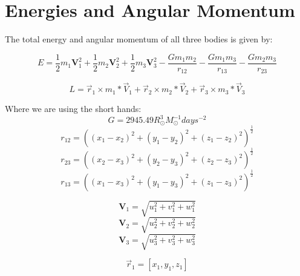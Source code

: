 \documentclass[letterpaper,12pt]{article}
\begin{document}
\section{Energies and Angular Momentum}
The total energy and angular momentum of all three bodies is given by:

\begin{equation} \label{eq:ergo}
    E = \frac{1}{2}m_{1}\textbf{V}_{1}^{2}+\frac{1}{2}m_{2}\textbf{V}_{2}^{2}+\frac{1}{2}m_{3}\textbf{V}_{3}^{2} - \frac{Gm_{1}m_{2}}{r_{12}} - \frac{Gm_{1}m_{3}}{r_{13}} - \frac{Gm_{2}m_{3}}{r_{23}}
\end{equation}

\begin{equation}
    L = \Vec{r}_{1}\times m_{1}*\Vec{V}_{1}+\Vec{r}_{2}\times m_{2}*\Vec{V}_{2}+\Vec{r}_{3}\times m_{3}*\Vec{V}_{3}
\end{equation}

Where we are using the short hands:
\begin{equation}
    G = 2945.49 R_{\odot}^{3}M_{\odot}^{-1}days^{-2}
\end{equation}
\begin{equation}
    r_{12} = ((x_{1} - x_{2})^{2} + (y_{1} - y_{2})^{2} + (z_{1} - z_{2})^{2})^{\frac{1}{2}}
\end{equation}
\begin{equation}
    r_{23} = ((x_{2} - x_{3})^{2} + (y_{2} - y_{3})^{2} + (z_{2} - z_{3})^{2})^{\frac{1}{2}}
\end{equation}
\begin{equation}
    r_{13} = ((x_{1} - x_{3})^{2} + (y_{1} - y_{3})^{2} + (z_{1} - z_{3})^{2})^{\frac{1}{2}}
\end{equation}

\begin{equation} \label{eq:ergo}
    \textbf{V}_{1} = \sqrt{u_{1}^{2} + v_{1}^{2} + w_{1}^{2}}
\end{equation}
\begin{equation} \label{eq:ergo}
    \textbf{V}_{2} = \sqrt{u_{2}^{2} + v_{2}^{2} + w_{2}^{2}}
\end{equation}
\begin{equation} \label{eq:ergo}
    \textbf{V}_{3} = \sqrt{u_{3}^{2} + v_{3}^{2} + w_{3}^{2}}
\end{equation}

\begin{equation} \label{eq:ergo}
    \Vec{r}_{1} = [x_{1}, y_{1}, z_{1}]
\end{equation}
\end{document}
